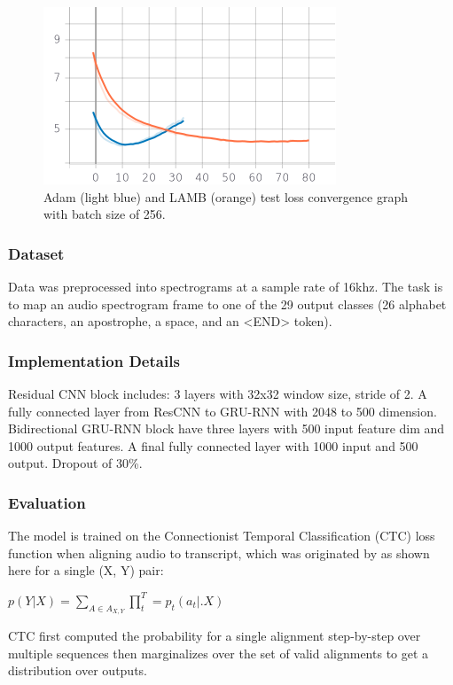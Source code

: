 \begin{figure}[!t]
    \centering
    \includegraphics[width=0.7\linewidth]{img/adam_blue_lamb_orange_drqa_256.png}
    \caption{Adam (light blue) and LAMB (orange) test loss convergence graph with batch size of 256.}
    \label{fig:256}
\end{figure}

\subsubsection{Dataset}

Data was preprocessed into spectrograms at a sample rate of 16khz. The task is to map an audio spectrogram frame to one of the 29 output classes (26 alphabet characters, an apostrophe, a space, and an <END> token). 


\subsubsection{Implementation Details}

Residual CNN block includes: 3 layers with 32x32 window size, stride of 2. A fully connected layer from ResCNN to GRU-RNN with 2048 to 500 dimension. Bidirectional GRU-RNN block have three layers with 500 input feature dim and 1000 output features. A final fully connected layer with 1000 input and 500 output. Dropout of 30\%.




\subsubsection{Evaluation}

The model is trained on the Connectionist Temporal Classification (CTC) loss function when aligning audio to transcript, which was originated by \cite{CTC} as shown here for a single (X, Y) pair: 
\begin{center}
$p(Y | X) = \sum_{A\in A_{X, Y}} \prod_t^T = p_t(a_t |. X)$    
\end{center}

CTC first computed the probability for a single alignment step-by-step over multiple sequences then marginalizes over the set of valid alignments to get a distribution over outputs.  